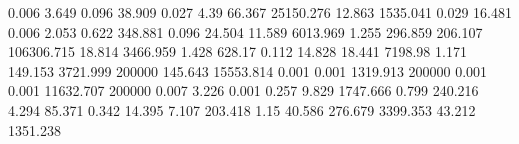 0.006      3.649      %
0.096      38.909     %
0.027      4.39       %
66.367     25150.276  %
12.863     1535.041   %
0.029      16.481     %
0.006      2.053      %
0.622      348.881    %
0.096      24.504     %
11.589     6013.969   %
1.255      296.859    %
206.107    106306.715 %
18.814     3466.959   %
1.428      628.17     %
0.112      14.828     %
18.441     7198.98    %
1.171      149.153    %
3721.999   200000     %
145.643    15553.814  %
0.001      0.001      %
1319.913   200000     %
0.001      0.001      %
11632.707  200000     %
0.007      3.226      %
0.001      0.257      %
9.829      1747.666   %
0.799      240.216    %
4.294      85.371     %
0.342      14.395     %
7.107      203.418    %
1.15       40.586     %
276.679    3399.353   %
43.212     1351.238   %
